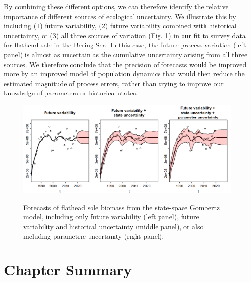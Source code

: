 \lstset{style=Rcode}


By combining these different options, we can therefore identify the relative importance of different sources of ecological uncertainty.  We illustrate this by including (1) future variability, (2) future variability combined with historical uncertainty, or (3) all three sources of variation (Fig. \ref{fig:Chap3_gompertz_forecast}) in our fit to survey data for flathead sole in the Bering Sea.  In this case, the future process variation (left panel) is almost as uncertain as the cumulative uncertainty arising from all three sources.  We therefore conclude that the precision of forecasts would be improved more by an improved model of population dynamics that would then reduce the estimated magnitude of process errors, rather than trying to improve our knowledge of parameters or historical states.  

\begin{figure}[!ht]
    \caption[Forecast uncertainty for state-space Gompertz model]{Forecasts of flathead sole biomass from the state-space Gompertz model, including only future variability (left panel), future variability and historical uncertainty (middle panel), or also including parametric uncertainty (right panel).}
    \centering
    \includegraphics[width=5.5in]{Chap_3/gompertz_forecast.png}
    \label{fig:Chap3_gompertz_forecast}
\end{figure}

\section{Chapter Summary}

